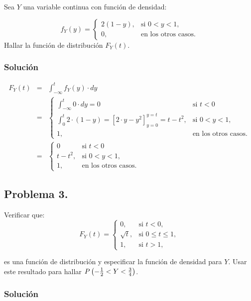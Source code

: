 \documentclass[
]{article}
\begin{document}
Sea \(Y\) una variable continua con función de densidad:

\[
f_Y(y)=
\left\{\begin{array}{ll}
2(1-y), & \mbox{si $0<y<1$},\\ 0, & \mbox{en los otros casos}.
\end{array}\right.
\] Hallar la función de distribución \(F_Y(t)\).

\hypertarget{soluciuxf3n-1}{%
\subsubsection{Solución}\label{soluciuxf3n-1}}

\begin{eqnarray*}
F_Y(t)&=&\int_{-\infty}^t f_Y(y)\cdot  dy\\ &=&
\left\{
\begin{array}{ll}
\int_{-\infty}^t 0\cdot dy=0 & \mbox{si } t<0\\
\int_{0}^t 2\cdot (1-y)= \left[2\cdot y- y^2\right]_{y=0}^{y=t}=t-t^2, & \mbox{si } 0<y<1,\\ 
1, & \mbox{en los otros casos}.
\end{array}\right.\\
&=&
\left\{
\begin{array}{ll}
0 & \mbox{si } t<0\\
t-t^2, & \mbox{si } 0<y<1,\\ 
1, & \mbox{en los otros casos}.
\end{array}\right.
\end{eqnarray*}

\hypertarget{problema-3.}{%
\subsection{Problema 3.}\label{problema-3.}}

Verificar que: \[
F_Y(t)=
\left\{\begin{array}{ll}
0, & \mbox{si $t<0$},\\
\sqrt{t}, & \mbox{si $0\leq t\leq 1$},\\ 1, &
\mbox{si $t>1$},
\end{array}\right.
\]

es una función de distribución y especificar la función de densidad para
\(Y\). Usar este resultado para hallar
\(P\left(-{1\over 2}<Y<{3\over 4}\right)\).

\hypertarget{soluciuxf3n-2}{%
\subsubsection{Solución}\label{soluciuxf3n-2}}
\end{document}
